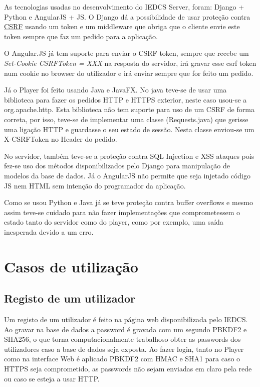 \documentclass[pdftex,12pt,a4paper]{report}
\begin{document}
As tecnologias usadas no desenvolvimento do IEDCS Server, foram: Django + Python e AngularJS + JS. O Django dá a possibilidade de usar proteção contra \href{https://docs.djangoproject.com/en/1.8/ref/csrf/}{CSRF} usando um token e um middleware que obriga que o cliente envie este token sempre que faz um pedido para a aplicação.  

O Angular.JS já tem suporte para enviar o CSRF token, sempre que recebe um \textit{Set-Cookie CSRFToken = XXX} na resposta do servidor, irá gravar esse csrf token num cookie no browser do utilizador e irá enviar sempre que for feito um pedido.

Já o Player foi feito usando Java e JavaFX. No java teve-se de usar uma biblioteca para fazer os pedidos HTTP e HTTPS exterior, neste caso usou-se a org.apache.http. Esta biblioteca não tem suporte para uso de um CSRF de forma correta, por isso, teve-se de implementar uma classe (Requests.java) que gerisse uma ligação HTTP e guardasse o seu estado de sessão. Nesta classe enviou-se um X-CSRFToken no Header do pedido.

No servidor, também teve-se a proteção contra SQL Injection e XSS ataques pois fez-se uso dos métodos disponibilizados pelo Django para manipulação de modelos da base de dados. Já o AngularJS não permite que seja injetado código JS nem HTML sem intenção do programador da aplicação.

Como se usou Python e Java já se teve proteção contra buffer overflows e mesmo assim teve-se cuidado para não fazer implementações que comprometessem o estado tanto do servidor como do player, como por exemplo, uma saída inesperada devido a um erro.

\section{Casos de utilização}

\subsection{Registo de um utilizador}

Um registo de um utilizador é feito na página web disponibilizada pelo IEDCS. Ao gravar na base de dados a password é gravada com um segundo PBKDF2 e SHA256, o que torna computacionalmente trabalhoso obter as passwords dos utilizadores caso a base de dados seja exposta. Ao fazer login, tanto no Player como na interface Web é aplicado PBKDF2 com HMAC e SHA1 para caso o HTTPS seja comprometido, as passwords não sejam enviadas em claro pela rede ou  caso se esteja a usar HTTP.
\end{document}
